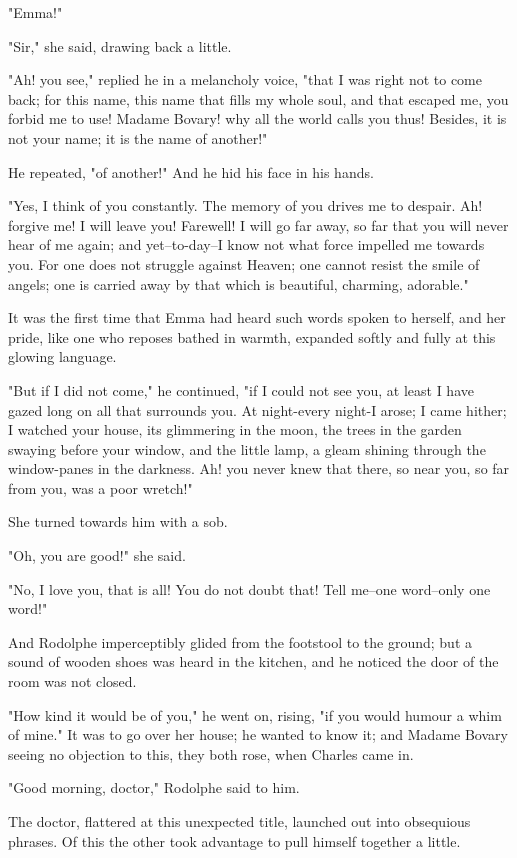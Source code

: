 \documentclass[11pt,twocolumn]{ltugboat}
\begin{document}
"Emma!"

"Sir," she said, drawing back a little.

"Ah! you see," replied he in a melancholy voice, "that I was right not
to come back; for this name, this name that fills my whole soul, and
that escaped me, you forbid me to use! Madame Bovary! why all the
world calls you thus! Besides, it is not your name; it is the name of
another!"

He repeated, "of another!" And he hid his face in his hands.

"Yes, I think of you constantly. The memory of you drives me to despair.
Ah! forgive me! I will leave you! Farewell! I will go far away, so far
that you will never hear of me again; and yet--to-day--I know not what
force impelled me towards you. For one does not struggle against Heaven;
one cannot resist the smile of angels; one is carried away by that which
is beautiful, charming, adorable."

It was the first time that Emma had heard such words spoken to herself,
and her pride, like one who reposes bathed in warmth, expanded softly
and fully at this glowing language.

"But if I did not come," he continued, "if I could not see you, at least
I have gazed long on all that surrounds you. At night-every night-I
arose; I came hither; I watched your house, its glimmering in the moon,
the trees in the garden swaying before your window, and the little lamp,
a gleam shining through the window-panes in the darkness. Ah! you never
knew that there, so near you, so far from you, was a poor wretch!"

She turned towards him with a sob.

"Oh, you are good!" she said.

"No, I love you, that is all! You do not doubt that! Tell me--one
word--only one word!"

And Rodolphe imperceptibly glided from the footstool to the ground; but
a sound of wooden shoes was heard in the kitchen, and he noticed the
door of the room was not closed.

"How kind it would be of you," he went on, rising, "if you would humour
a whim of mine." It was to go over her house; he wanted to know it; and
Madame Bovary seeing no objection to this, they both rose, when Charles
came in.

"Good morning, doctor," Rodolphe said to him.

The doctor, flattered at this unexpected title, launched out into
obsequious phrases. Of this the other took advantage to pull himself
together a little.
\end{document}
